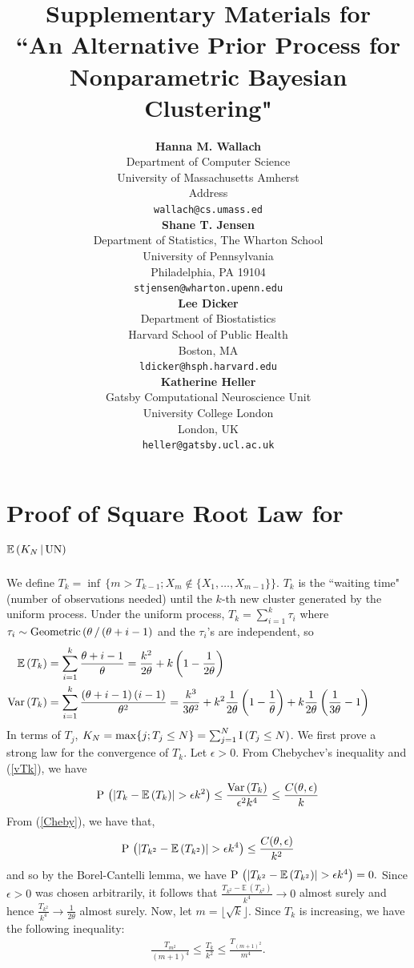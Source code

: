\documentclass{article}
\title{Supplementary Materials for \\ ``An Alternative Prior Process for\\
Nonparametric Bayesian Clustering"}
\author{
{\bf Hanna M. Wallach}\\
Department of Computer Science \\
University of Massachusetts Amherst \\
Address \\
\texttt{wallach@cs.umass.ed} \\
\And
{\bf Shane T. Jensen}\\
Department of Statistics, The Wharton School\\
University of Pennsylvania\\
Philadelphia, PA 19104 \\
\texttt{stjensen@wharton.upenn.edu} \\
\AND
{\bf Lee Dicker} \\
Department of Biostatistics\\
Harvard School of Public Health\\
Boston, MA \\
\texttt{ldicker@hsph.harvard.edu} \\
\And
{\bf Katherine Heller} \\
Gatsby Computational Neuroscience Unit \\
University College London \\
London, UK \\
\texttt{heller@gatsby.ucl.ac.uk} \\
}
\begin{document}
\makeanontitle

\section{Proof of Square Root Law for $\mathbb{E}\,(K_N\,|\,{\rm UN})$} \label{UNmomresults}

We define $T_k = \inf\, \{ m > T_{k-1} ; X_m \notin \{X_1, \ldots, X_{m-1} \}\}$.  $T_k$ is the ``waiting time" (number of observations needed) until the $k$-th new cluster generated by the uniform process.   Under the uniform process, $T_k = \sum_{i=1}^k \tau_i$ where $\tau_i \sim {\rm Geometric}\, (\theta\,/\,(\theta + i - 1)$ and the $\tau_i$'s are independent, so 
\begin{align}
\mathbb{E}\, (T_k) &= \sum\limits_{i=1}^k \frac{\theta + i - 1}{\theta} = \frac{k^2}{2 \theta} + k \left( 1 - \frac{1}{2 \theta} \right) \label{eTk} \\
 {\rm Var}\, (T_k) &= \sum\limits_{i=1}^k \frac{(\theta + i - 1)\,(i - 1)}{\theta^2} = \frac{k^3}{3 \theta^2} + k^2 \frac{1}{2\theta} \left( 1 - \frac{1}{\theta} \right) + k \frac{1}{2\theta} \left( \frac{1}{3 \theta} - 1 \right) \hspace{1.25cm} \label{vTk}
\end{align}
In terms of $T_j$,  $K_N = \max \{ j ; T_j \leq N \} = \sum_{j=1}^N
{\rm I}\, (T_j \leq N)$.     We first prove a strong law for the
convergence of $T_k$.  Let $\epsilon > 0$.  From Chebychev's
inequality and (\ref{vTk}), we have
\begin{align}
{\rm P}\, \left(|T_k - \mathbb{E}\, (T_k) | > \epsilon  k^2\right) \leq \frac{{\rm Var}\, (T_k) }{\epsilon^2k^4}  \leq \frac{C(\theta,\epsilon)}{k} \label{Cheby}
\end{align}
From (\ref{Cheby}), we have that, 
\begin{align*}
{\rm P}\, \left(|T_{k^2} - \mathbb{E}\, (T_{k^2})| > \epsilon k^4 \right) \leq \frac{C(\theta,\epsilon)}{k^2} 
\end{align*} 
and so by the  Borel-Cantelli lemma, we have ${\rm P}\, \left(|T_{k^2} - \mathbb{E}\,(T_{k^2})| > \epsilon k^4 \right) = 0.$
Since $\epsilon > 0$ was chosen arbitrarily, it follows that $\frac{T_{k^2} - \mathbb{E}\,(T_{k^2})}{k^4} \to 0$ almost surely and hence 
$\frac{T_{k^2}}{k^4} \to \frac{1}{2\theta}$ almost surely. Now, let $m = \lfloor \sqrt{k} \rfloor$.  Since $T_k$ is
increasing, we have the following inequality:
\begin{align}
\frac{T_{m^2}}{(m + 1)^4} \leq \frac{T_k}{k^2} \leq
\frac{T_{(m + 1)^2}}{m^4}.   \label{subseq}
\end{align}
\end{document}
